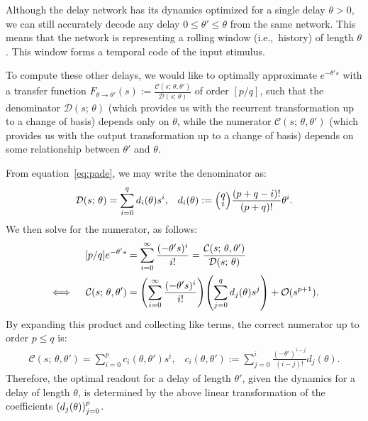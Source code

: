 \documentclass[12pt]{article}
\theoremstyle{definition}
\let\originalleft\left
\let\originalright\right
\renewcommand{\left}{\mathopen{}\mathclose\bgroup\originalleft}
\renewcommand{\right}{\aftergroup\egroup\originalright}
\newenvironment{hpmatrix}{\begingroup\def\arraystretch{0.5}\begin{pmatrix}}{\end{pmatrix}\endgroup\ignorespacesafterend}
\begin{document}
Although the delay network has its dynamics optimized for a single delay $\theta > 0$, we can still accurately decode any delay $0 \le \theta' \le \theta$ from the same network.
This means that the network is representing a rolling window (i.e.,~history) of length $\theta$.
This window forms a temporal code of the input stimulus.

To compute these other delays, we would like to optimally approximate $e^{-\theta' s}$ with a transfer function $F_{\theta \rightarrow \theta'}(s) := \frac{\mathcal{C}(s; \, \theta, \theta')}{\mathcal{D}(s; \, \theta)}$ of order $[p / q]$, such that the denominator $\mathcal{D}(s; \, \theta)$ (which provides us with the recurrent transformation up to a change of basis) depends only on $\theta$, while the numerator $\mathcal{C}(s; \, \theta, \theta')$ (which provides us with the output transformation up to a change of basis) depends on some relationship between $\theta'$ and $\theta$.

From equation~\ref{eq:pade}, we may write the denominator as:
\begin{align*}
\mathcal{D}(s; \, \theta) = \sum_{i=0}^q d_i(\theta) s^i \text{,} \quad d_i(\theta) := \begin{hpmatrix}q \\ i\end{hpmatrix} \frac{(p + q - i)!}{(p + q)!} \theta^i \text{.}
\end{align*}
We then solve for the numerator, as follows:
\begin{align*}
&& [p/q] e^{-\theta' s} &= \sum_{i=0}^\infty \frac{(-\theta' s)^i}{i !} = \frac{\mathcal{C}(s; \, \theta, \theta')}{\mathcal{D}(s; \, \theta)} & \\
&& \iff \quad \mathcal{C}(s; \, \theta, \theta') &= \left( \sum_{i=0}^\infty \frac{(-\theta' s)^i}{i !} \right) \left( \sum_{j=0}^q d_j(\theta) s^j \right) + \mathcal{O}(s^{p + 1}) \text{.}
\end{align*}
By expanding this product and collecting like terms, the correct numerator up to order $p \le q$ is:
\begin{align*}
\mathcal{C}(s; \, \theta, \theta') = \sum_{i=0}^p c_i(\theta, \theta') s^i \text{,} \quad c_i(\theta, \theta') :=  \sum_{j=0}^i \frac{(- \theta')^{i - j}}{(i - j)!} d_j(\theta) \text{.}
\end{align*}
Therefore, the optimal readout for a delay of length $\theta'$, given the dynamics for a delay of length $\theta$, is determined by the above linear transformation of the coefficients $\left( d_j(\theta) \right)_{j=0}^p$.
\end{document}
